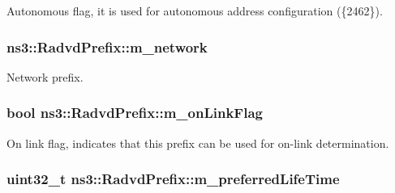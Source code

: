 Autonomous flag, it is used for autonomous address configuration (\{2462\}). 

\subsubsection[{\texorpdfstring{m\+\_\+network}{m_network}}]{ ns3\+::\+Radvd\+Prefix\+::m\+\_\+network\hspace{0.3cm}{\ttfamily [private]}}\hypertarget{classns3_1_1RadvdPrefix_a84fa239cc120bf52f476416a010a40f5}{}\label{classns3_1_1RadvdPrefix_a84fa239cc120bf52f476416a010a40f5}


Network prefix. 

\subsubsection[{\texorpdfstring{m\+\_\+on\+Link\+Flag}{m_onLinkFlag}}]{\setlength{\rightskip}{0pt plus 5cm}bool ns3\+::\+Radvd\+Prefix\+::m\+\_\+on\+Link\+Flag\hspace{0.3cm}{\ttfamily [private]}}\hypertarget{classns3_1_1RadvdPrefix_a68f492279ddcc42a8b598fd856f834e8}{}\label{classns3_1_1RadvdPrefix_a68f492279ddcc42a8b598fd856f834e8}


On link flag, indicates that this prefix can be used for on-\/link determination. 

\subsubsection[{\texorpdfstring{m\+\_\+preferred\+Life\+Time}{m_preferredLifeTime}}]{\setlength{\rightskip}{0pt plus 5cm}uint32\+\_\+t ns3\+::\+Radvd\+Prefix\+::m\+\_\+preferred\+Life\+Time\hspace{0.3cm}{\ttfamily [private]}}\hypertarget{classns3_1_1RadvdPrefix_a4206d6b7beb2febcbb7783bc9cc6eacd}{}\label{classns3_1_1RadvdPrefix_a4206d6b7beb2febcbb7783bc9cc6eacd}


